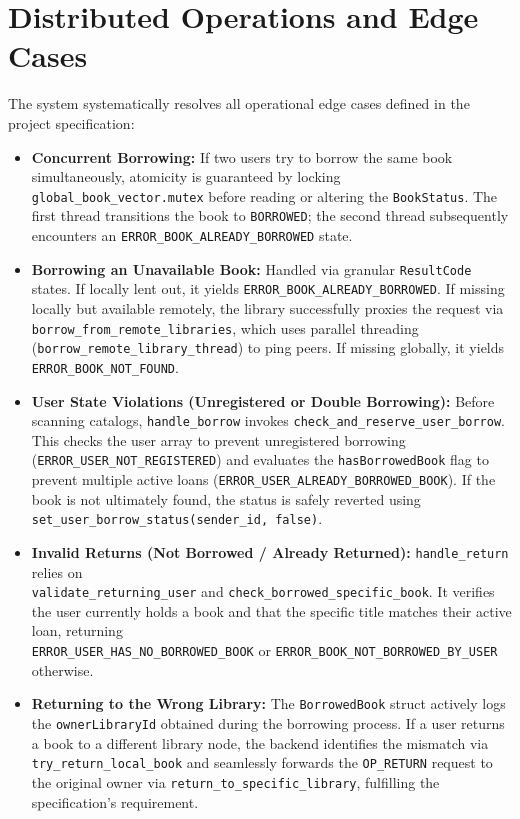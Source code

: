 \documentclass[11pt, a4paper]{article}
\begin{document}
\section{Distributed Operations and Edge Cases}

The system systematically resolves all operational edge cases defined in the project specification:

\begin{itemize}[leftmargin=*]
    \item \textbf{Concurrent Borrowing:} If two users try to borrow the same book simultaneously, atomicity is guaranteed by locking \texttt{global\_book\_vector.mutex} before reading or altering the \texttt{BookStatus}. The first thread transitions the book to \texttt{BORROWED}; the second thread subsequently encounters an \texttt{ERROR\_BOOK\_ALREADY\_BORROWED} state.
    \item \textbf{Borrowing an Unavailable Book:} Handled via granular \texttt{ResultCode} states. If locally lent out, it yields \texttt{ERROR\_BOOK\_ALREADY\_BORROWED}. If missing locally but available remotely, the library successfully proxies the request via \texttt{borrow\_from\_remote\_libraries}, which uses parallel threading (\texttt{borrow\_remote\_library\_thread}) to ping peers. If missing globally, it yields \texttt{ERROR\_BOOK\_NOT\_FOUND}.
    \item \textbf{User State Violations (Unregistered or Double Borrowing):} Before scanning catalogs, \texttt{handle\_borrow} invokes \texttt{check\_and\_reserve\_user\_borrow}. This checks the user array to prevent unregistered borrowing (\texttt{ERROR\_USER\_NOT\_REGISTERED}) and evaluates the \texttt{hasBorrowedBook} flag to prevent multiple active loans (\texttt{ERROR\_USER\_ALREADY\_BORROWED\_BOOK}). If the book is not ultimately found, the status is safely reverted using \texttt{set\_user\_borrow\_status(sender\_id, false)}.
    \item \textbf{Invalid Returns (Not Borrowed / Already Returned):} \texttt{handle\_return} relies on\\ \texttt{validate\_returning\_user} and \texttt{check\_borrowed\_specific\_book}. It verifies the user currently holds a book and that the specific title matches their active loan, returning\\ \texttt{ERROR\_USER\_HAS\_NO\_BORROWED\_BOOK} or \texttt{ERROR\_BOOK\_NOT\_BORROWED\_BY\_USER} otherwise.
    \item \textbf{Returning to the Wrong Library:} The \texttt{BorrowedBook} struct actively logs the \texttt{ownerLibraryId} obtained during the borrowing process. If a user returns a book to a different library node, the backend identifies the mismatch via \texttt{try\_return\_local\_book} and seamlessly forwards the \texttt{OP\_RETURN} request to the original owner via \texttt{return\_to\_specific\_library}, fulfilling the specification's requirement.

\end{itemize}
\end{document}
